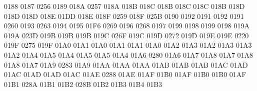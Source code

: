  0188 0187 %
 0256 0189 %
\setcclcucx 018A 0257 018A %
\setcclcucx 018B 018C 018B %
\setcclcucx 018C 018C 018B %
\setcclcucx 018D 018D 018D %
\setcclcucx 018E 01DD 018E %
\setcclcucx 018F 0259 018F %
 025B 0190 %
 0192 0191 %
 0192 0191 %
 0260 0193 %
 0263 0194 %
 0195 01F6 %
 0269 0196 %
 0268 0197 %
 0199 0198 %
 0199 0198 %
\setcclcucx 019A 019A 023D %
\setcclcucx 019B 019B 019B %
\setcclcucx 019C 026F 019C %
\setcclcucx 019D 0272 019D %
\setcclcucx 019E 019E 0220 %
\setcclcucx 019F 0275 019F %
\setcclcucx 01A0 01A1 01A0 %
\setcclcucx 01A1 01A1 01A0 %
\setcclcucx 01A2 01A3 01A2 %
\setcclcucx 01A3 01A3 01A2 %
\setcclcucx 01A4 01A5 01A4 %
\setcclcucx 01A5 01A5 01A4 %
\setcclcucx 01A6 0280 01A6 %
\setcclcucx 01A7 01A8 01A7 %
\setcclcucx 01A8 01A8 01A7 %
\setcclcucx 01A9 0283 01A9 %
\setcclcucx 01AA 01AA 01AA %
\setcclcucx 01AB 01AB 01AB %
\setcclcucx 01AC 01AD 01AC %
\setcclcucx 01AD 01AD 01AC %
\setcclcucx 01AE 0288 01AE %
\setcclcucx 01AF 01B0 01AF %
\setcclcucx 01B0 01B0 01AF %
\setcclcucx 01B1 028A 01B1 %
\setcclcucx 01B2 028B 01B2 %
\setcclcucx 01B3 01B4 01B3 %
